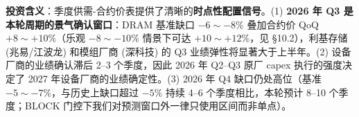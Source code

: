 \vspace{0.4em}
\noindent\textbf{投资含义}：季度供需-合约价表提供了清晰的\textbf{时点性配置信号}。(1) \textbf{2026 年 Q3 是本轮周期的景气确认窗口}：DRAM 基准缺口 \(-6\sim-8\%\) 叠加合约价 QoQ \(+8\sim+10\%\)（乐观 \(-8\sim-10\%\) 情景下可达 \(+10\sim+12\%\)，见 §10.2），利基存储 (兆易/江波龙) 和模组厂商 (深科技) 的 Q3 业绩弹性将显著大于上半年。(2) 设备厂商的业绩确认滞后 2--3 个季度，因此 2026 年 Q2--Q3 原厂 capex 执行的强度决定了 2027 年设备厂商的业绩确定性。(3) 2026 年 Q4 缺口仍处高位（基准 \(-5\sim-7\%\)，与历史上缺口超过 \(-5\%\) 持续 4--6 个季度相比，本轮预计 8--10 个季度；BLOCK 门控下我们对预测窗口外一律只使用区间而非单点）。
